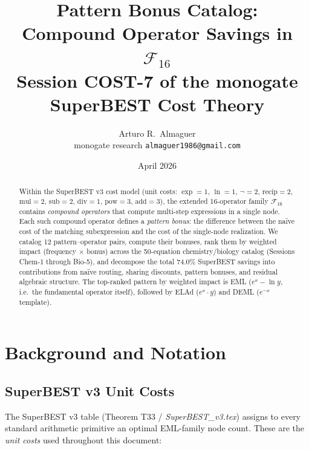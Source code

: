 \documentclass[12pt,a4paper]{article}
\title{Pattern Bonus Catalog:\\
       Compound Operator Savings in $\mathcal{F}_{16}$\\[6pt]
       \large Session COST-7 of the monogate SuperBEST Cost Theory}
\author{Arturo R.\ Almaguer\\
\small monogate research \quad \texttt{almaguer1986@gmail.com}}
\date{April 2026}
\theoremstyle{definition}
\begin{document}
\maketitle

\begin{abstract}
Within the SuperBEST v3 cost model (unit costs: $\exp=1$, $\ln=1$, $\neg=2$,
$\mathrm{recip}=2$, $\mathrm{mul}=2$, $\mathrm{sub}=2$, $\mathrm{div}=1$,
$\mathrm{pow}=3$, $\mathrm{add}=3$), the extended 16-operator family
$\mathcal{F}_{16}$ contains \emph{compound operators} that compute
multi-step expressions in a single node.
Each such compound operator defines a \emph{pattern bonus}: the difference
between the na\"{i}ve cost of the matching subexpression and the cost of
the single-node realization.
We catalog 12 pattern--operator pairs, compute their bonuses, rank them by
weighted impact (frequency $\times$ bonus) across the 50-equation
chemistry/biology catalog (Sessions Chem-1 through Bio-5), and decompose
the total 74.0\% SuperBEST savings into contributions from na\"{i}ve
routing, sharing discounts, pattern bonuses, and residual algebraic
structure.
The top-ranked pattern by weighted impact is \textsf{EML} ($e^x - \ln y$,
i.e.\ the fundamental operator itself), followed by \textsf{ELAd} ($e^x
\cdot y$) and \textsf{DEML} ($e^{-x}$ template).
\end{abstract}

\tableofcontents
\bigskip

\section{Background and Notation}
\label{sec:background}

\subsection{SuperBEST v3 Unit Costs}

The SuperBEST v3 table (Theorem T33 / \textit{SuperBEST\_v3.tex}) assigns
to every standard arithmetic primitive an optimal EML-family node count.
These are the \emph{unit costs} used throughout this document:
\end{document}
